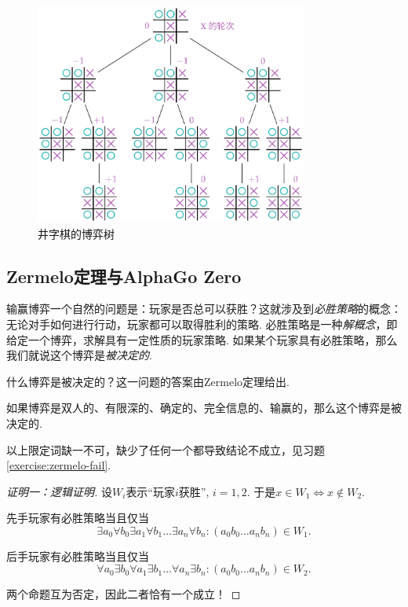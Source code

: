 \begin{figure}
    \centering
    \includegraphics[width=0.8\textwidth]{figures/game/game-tree.pdf}
    \caption{井字棋的博弈树}
    \label{fig:game-tree}
\end{figure}

\subsection{Zermelo定理与AlphaGo Zero}

输赢博弈一个自然的问题是：玩家是否总可以获胜？这就涉及到\textit{必胜策略}的概念：无论对手如何进行行动，玩家都可以取得胜利的策略. 必胜策略是一种\textit{解概念}，即给定一个博弈，求解具有一定性质的玩家策略. 如果某个玩家具有必胜策略，那么我们就说这个博弈是\textit{被决定的}. 

什么博弈是被决定的？这一问题的答案由Zermelo定理给出.

\begin{theorem}[Zermelo定理]\label{thm:zermelo}
如果博弈是双人的、有限深的、确定的、完全信息的、输赢的，那么这个博弈是被决定的.
\end{theorem}
以上限定词缺一不可，缺少了任何一个都导致结论不成立，见习题 \ref{exercise:zermelo-fail}.

\begin{proof}[证明一：逻辑证明]
设$W_i$表示“玩家$i$获胜”, $i=1,2$. 于是$x\in W_1\iff x\not\in W_2$.

先手玩家有必胜策略当且仅当
\[\exists a_0\forall b_0\exists a_1\forall b_1\dots\exists a_n\forall b_n: (a_0b_0\dots a_nb_n)\in W_1.\]

后手玩家有必胜策略当且仅当
\[\forall a_0\exists b_0\forall a_1\exists b_1\dots\forall a_n\exists b_n: (a_0b_0\dots a_nb_n)\in W_2.\]

两个命题互为否定，因此二者恰有一个成立！
\end{proof}

